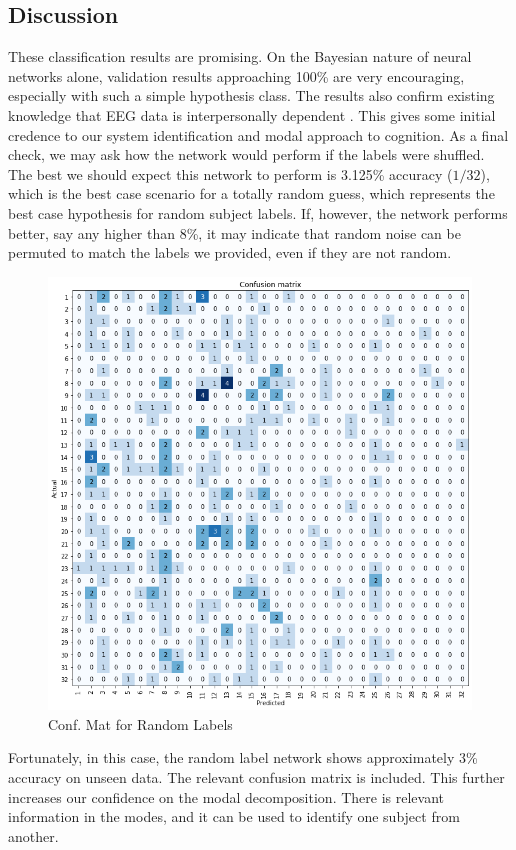 \subsection{Discussion}
These classification results are promising. On the Bayesian nature of neural networks alone, validation results approaching 100\% are very encouraging, especially with such a simple hypothesis class. The results also confirm existing knowledge that EEG data is interpersonally dependent \cite{makeig2012evolving}. This gives some initial credence to our system identification and modal approach to cognition. As a final check, we may ask how the network would perform if the labels were shuffled. The best we should expect this network to perform is 3.125\% accuracy ($1/32$), which is the best case scenario for a totally random guess, which represents the best case hypothesis for random subject labels. If, however, the network performs better, say any higher than 8\%, it may indicate that random noise can be permuted to match the labels we provided, even if they are not random.   
\begin{figure}
\centering
\includegraphics[scale=0.45]{../../../figures/conf_mat_random.png} 
\caption{Conf. Mat for Random Labels}
\label{fig:random}
\end{figure}  
Fortunately, in this case, the random label network shows approximately 3\% accuracy on unseen data. The relevant confusion matrix is included. This further increases our confidence on the modal decomposition. There is relevant information in the modes, and it can be used to identify one subject from another.

